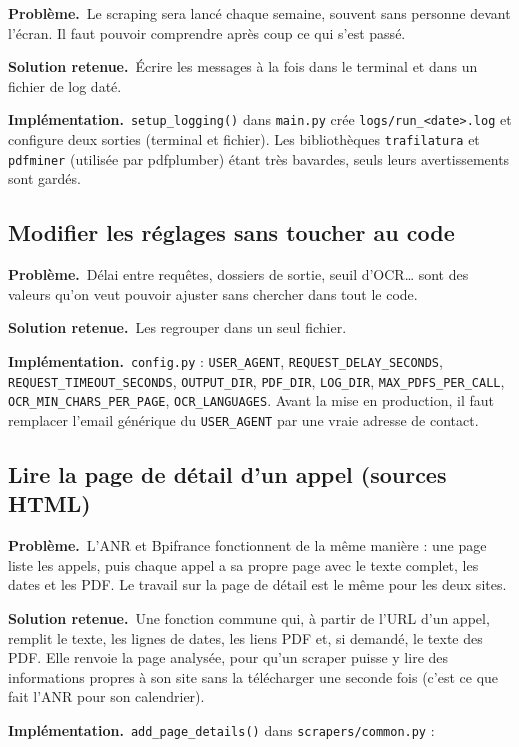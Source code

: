 \documentclass[11pt,a4paper]{article}
\newcommand{\pb}{\par\medskip\noindent\textbf{\textcolor{pbcolor}{Problème.}}\ }
\newcommand{\sol}{\par\medskip\noindent\textbf{\textcolor{solcolor}{Solution retenue.}}\ }
\newcommand{\impl}{\par\medskip\noindent\textbf{\textcolor{implcolor}{Implémentation.}}\ }
\newcommand{\code}[1]{\texttt{#1}}
\begin{document}
\pb Le scraping sera lancé chaque semaine, souvent sans personne devant l'écran. Il faut
pouvoir comprendre après coup ce qui s'est passé.

\sol Écrire les messages à la fois dans le terminal et dans un fichier de log daté.

\impl \code{setup\_logging()} dans \code{main.py} crée \code{logs/run\_<date>.log} et
configure deux sorties (terminal et fichier). Les bibliothèques \code{trafilatura} et
\code{pdfminer} (utilisée par pdfplumber) étant très bavardes, seuls leurs avertissements
sont gardés.

\subsection{Modifier les réglages sans toucher au code}

\pb Délai entre requêtes, dossiers de sortie, seuil d'OCR\dots{} sont des valeurs qu'on
veut pouvoir ajuster sans chercher dans tout le code.

\sol Les regrouper dans un seul fichier.

\impl \code{config.py} : \code{USER\_AGENT}, \code{REQUEST\_DELAY\_SECONDS},
\code{REQUEST\_TIMEOUT\_SECONDS}, \code{OUTPUT\_DIR}, \code{PDF\_DIR}, \code{LOG\_DIR},
\code{MAX\_PDFS\_PER\_CALL}, \code{OCR\_MIN\_CHARS\_PER\_PAGE}, \code{OCR\_LANGUAGES}. Avant
la mise en production, il faut remplacer l'email générique du \code{USER\_AGENT} par
une vraie adresse de contact.

\subsection{Lire la page de détail d'un appel (sources HTML)}

\pb L'ANR et Bpifrance fonctionnent de la même manière : une page liste les appels, puis
chaque appel a sa propre page avec le texte complet, les dates et les PDF. Le travail sur
la page de détail est le même pour les deux sites.

\sol Une fonction commune qui, à partir de l'URL d'un appel, remplit le texte, les lignes
de dates, les liens PDF et, si demandé, le texte des PDF. Elle renvoie la page analysée,
pour qu'un scraper puisse y lire des informations propres à son site sans la télécharger
une seconde fois (c'est ce que fait l'ANR pour son calendrier).

\impl \code{add\_page\_details()} dans \code{scrapers/common.py} :
\end{document}

